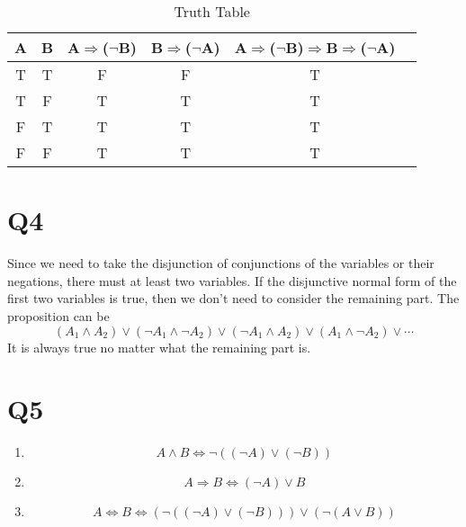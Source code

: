 \documentclass[12pt]{article}
\begin{document}
\begin{enumerate}[(i)]
\begin{table}[H]
\centering
\begin{tabular}{|c|c|c|c|c|c|}
\hline
A & B &A$\Rightarrow$($\neg$B)&B$\Rightarrow$($\neg$A)&A$\Rightarrow$($\neg$B)$\Rightarrow$B$\Rightarrow$($\neg$A) \\ \hline
T & T &F  &F  &T  \\ \hline
T & F &T  &T  &T  \\ \hline
F & T &T  &T  &T  \\ \hline
F & F &T  &T  &T  \\ \hline
\end{tabular}
\caption{Truth Table}
\end{table}
\end{enumerate}
\section{Q4}
Since we need to take the disjunction of conjunctions of the variables or their negations, there must at least two variables. If the disjunctive normal form of the first two variables is true, then we don't need to consider the remaining part. The proposition can be 
$$(A_1\wedge A_2)\vee (\neg A_1\wedge\neg A_2)\vee (\neg A_1\wedge A_2)\vee (A_1\wedge\neg A_2)\vee \cdots$$
It is always true no matter what the remaining part is.
\section{Q5}
\begin{enumerate}
\item
$$A\wedge B\Leftrightarrow\neg((\neg A)\vee(\neg B))$$
\item
$$A\Rightarrow B\Leftrightarrow(\neg A)\vee B$$
\item
$$A\Leftrightarrow B\Leftrightarrow(\neg((\neg A)\vee(\neg B)))\vee(\neg(A\vee B))$$
\end{enumerate}
\end{document}
